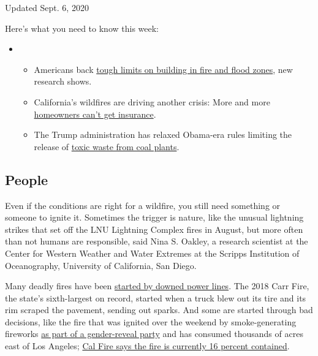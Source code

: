 Updated Sept. 6, 2020

Here's what you need to know this week:

\begin{itemize}
\item
  \begin{itemize}
  \tightlist
  \item
    Americans back
    \href{https://www.nytimes3xbfgragh.onion/2020/09/04/climate/flood-fire-building-restrictions.html?action=click\&pgtype=Article\&state=default\&region=MAIN_CONTENT_1\&context=storylines_keepup}{tough
    limits on building in fire and flood zones}, new research shows.
  \item
    California's wildfires are driving another crisis: More and more
    \href{https://www.nytimes3xbfgragh.onion/2020/09/02/climate/wildfires-insurance.html?action=click\&pgtype=Article\&state=default\&region=MAIN_CONTENT_1\&context=storylines_keepup}{homeowners
    can't get insurance}.
  \item
    The Trump administration has relaxed Obama-era rules limiting the
    release of
    \href{https://www.nytimes3xbfgragh.onion/2020/08/31/climate/trump-coal-plants.html?action=click\&pgtype=Article\&state=default\&region=MAIN_CONTENT_1\&context=storylines_keepup}{toxic
    waste from coal plants}.
  \end{itemize}
\end{itemize}

\hypertarget{people}{%
\subsection{People}\label{people}}

Even if the conditions are right for a wildfire, you still need
something or someone to ignite it. Sometimes the trigger is nature, like
the unusual lightning strikes that set off the LNU Lightning Complex
fires in August, but more often than not humans are responsible, said
Nina S. Oakley, a research scientist at the Center for Western Weather
and Water Extremes at the Scripps Institution of Oceanography,
University of California, San Diego.

Many deadly fires have been
\href{https://www.nytimes3xbfgragh.onion/interactive/2019/03/18/business/pge-california-wildfires.html}{started
by downed power lines}. The 2018 Carr Fire, the state's sixth-largest on
record, started when a truck blew out its tire and its rim scraped the
pavement, sending out sparks. And some are started through bad
decisions, like the fire that was ignited over the weekend by
smoke-generating fireworks
\href{https://www.nytimes3xbfgragh.onion/2020/09/07/us/gender-reveal-party-wildfire.html}{as
part of a gender-reveal party} and has consumed thousands of acres east
of Los Angeles;
\href{https://www.fire.ca.gov/incidents/2020/9/5/el-dorado-fire/}{Cal
Fire says the fire is currently 16 percent contained}.

